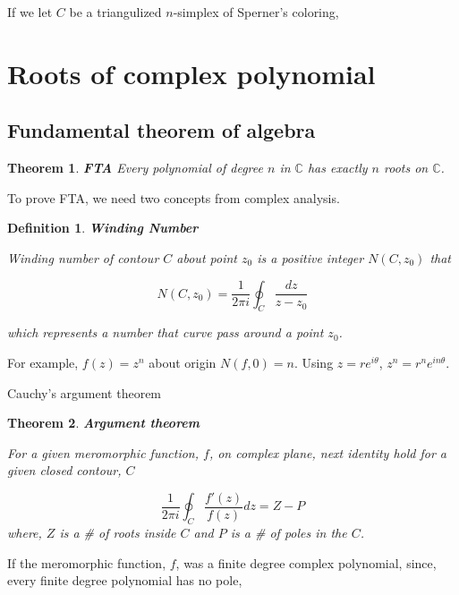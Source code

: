 \documentclass[a4paper,12pt]{article}
\newtheorem{theorem}{Theorem}
\newtheorem{definition}{Definition}
\begin{document}
If we let $C$ be a triangulized $n$-simplex of Sperner's coloring, 

\section{Roots of complex polynomial}

\subsection{Fundamental theorem of algebra}

\begin{theorem} \textbf{FTA}
    Every polynomial of degree $n$ in $\mathbb{C}$ has exactly $n$ roots on $\mathbb{C}$.
\end{theorem}

To prove FTA, we need two concepts from complex analysis.

\begin{definition}\textbf{Winding Number\cite{Wind_Wolf}}

    Winding number of contour $C$ about point $z_0$ is a positive integer $N(C, z_0)$ that

    \begin{equation}
        N(C, z_0) = \frac{1}{2 \pi i} \oint_C \frac{dz}{z-z_0}
    \end{equation}

    which represents a number that curve pass around a point $z_0$.
\end{definition}

For example, $f(z) = z^n$ about origin $N(f, 0) = n$. 
Using $z = r e^{i \theta}$, $z^n = r^n e^{i n \theta}$.


Cauchy's argument theorem

\begin{theorem} \textbf{Argument theorem\cite{9736615}}
    \label{theorem:Argument}

    For a given meromorphic function, $f$, on complex plane, next identity hold for a given closed contour, $C$

    \begin{equation}
        \frac{1}{2 \pi i} \oint_{C} \frac{f'(z)}{f(z)} dz=  Z - P 
    \end{equation}
    where, $Z$ is a \# of roots inside $C$ and $P$ is a \# of poles in the $C$.
\end{theorem}

If the meromorphic function, $f$, was a finite degree complex polynomial, 
since, every finite degree polynomial has no pole,
\end{document}
